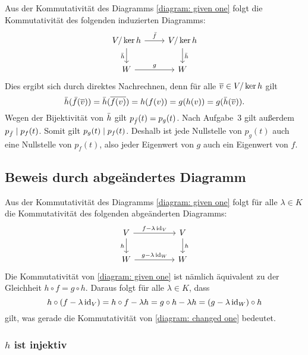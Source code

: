 Aus der Kommutativität des Diagramms \eqref{diagram: given one} folgt die Kommutativität des folgenden induzierten Diagramms:
\[
  \begin{tikzcd}
      V/\ker h
      \arrow{r}{\induced{f}}
      \arrow[swap]{d}{\induced{h}}
    & V/\ker h
      \arrow{d}{\induced{h}}
    \\
      W
      \arrow{r}{g}
    & W
  \end{tikzcd}
\]
Dies ergibt sich durch direktes Nachrechnen, denn für alle $\overline{v} \in V/\ker h$ gilt
\[
    \bar{h}( \bar{f}( \overline{v} ) )
  = \bar{h}( \overline{f(v)} )
  = h(f(v))
  = g(h(v))
  = g( \bar{h}( \overline{v} ) ).
\]
Wegen der Bijektivität von $\bar{h}$ gilt $p_{\bar{f}}(t) = p_g(t)$.
Nach Aufgabe~3 gilt außerdem $p_{\bar{f}} \mathrel{|} p_f(t)$.
Somit gilt $p_g(t) \mathrel{|} p_f(t)$.
Deshalb ist jede Nullstelle von $p_g(t)$ auch eine Nullstelle von $p_f(t)$, also jeder Eigenwert von $g$ auch ein Eigenwert von $f$.





\subsection*{Beweis durch abgeändertes Diagramm}

Aus der Kommutativität des Diagramms \eqref{diagram: given one} folgt für alle $\lambda \in K$ die Kommutativität des folgenden abgeänderten Diagramms:
\begin{equation}
  \label{diagram: changed one}
  \begin{tikzcd}[column sep = huge]
      V
      \arrow{r}{f - \lambda \id_V}
      \arrow[swap]{d}{h}
    & V
      \arrow{d}{h}
    \\
      W
      \arrow{r}{g - \lambda \id_W}
    & W
  \end{tikzcd}
\end{equation}
Die Kommutativität von \eqref{diagram: given one} ist nämlich äquivalent zu der Gleichheit $h \circ f = g \circ h$.
Daraus folgt für alle $\lambda \in K$, dass
\[
    h \circ (f - \lambda \operatorname{id}_V)
  = h \circ f - \lambda h
  = g \circ h - \lambda h
  = (g - \lambda \operatorname{id}_W) \circ h
\]
gilt, was gerade die Kommutativität von \eqref{diagram: changed one} bedeutet.



\subsubsection{\texorpdfstring{$h$}{h} ist injektiv}


